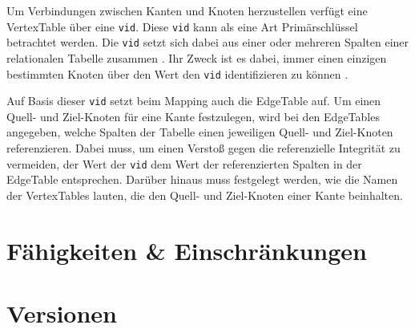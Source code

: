 Um Verbindungen zwischen Kanten und Knoten herzustellen  verfügt eine VertexTable über eine \texttt{vid}. Diese \texttt{vid} kann als eine Art Primärschlüssel betrachtet werden. Die \texttt{vid} setzt sich dabei aus einer oder mehreren Spalten einer relationalen Tabelle zusammen \cite{sigmod_tian, yt_tian}. Ihr Zweck ist es dabei, immer einen einzigen bestimmten Knoten über den Wert den \texttt{vid} identifizieren zu können \cite{sigmod_tian, yt_tian}. 

Auf Basis dieser \texttt{vid} setzt beim Mapping auch die EdgeTable auf. Um einen Quell- und Ziel-Knoten für eine Kante festzulegen, wird bei den EdgeTables angegeben, welche Spalten der Tabelle einen jeweiligen Quell- und Ziel-Knoten referenzieren. Dabei muss, um einen Verstoß gegen die referenzielle Integrität zu vermeiden, der Wert der \texttt{vid} dem Wert der referenzierten Spalten in der EdgeTable entsprechen. Darüber hinaus muss festgelegt werden, wie die  Namen der VertexTables lauten, die den Quell- und Ziel-Knoten einer Kante beinhalten. 

\section{Fähigkeiten \& Einschränkungen}

\section{Versionen}
